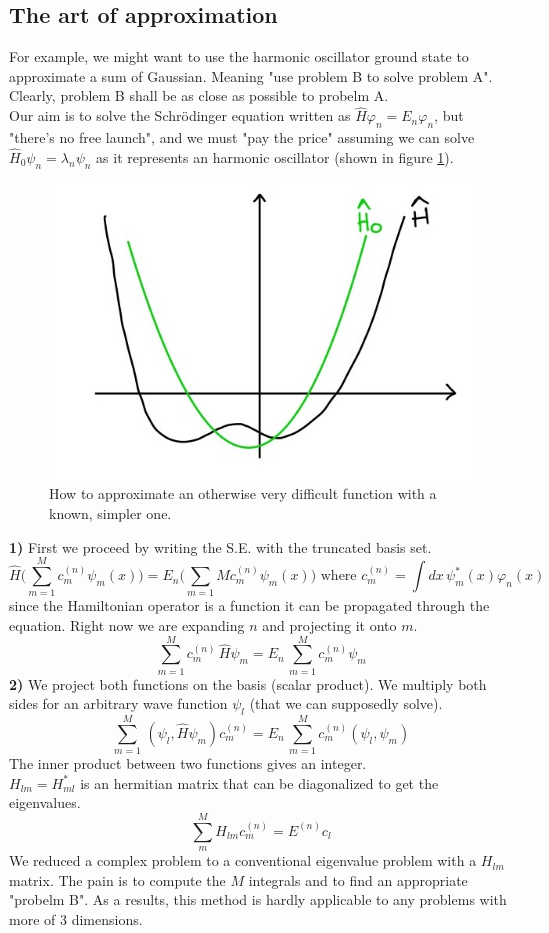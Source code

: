 \noindent
\subsection{The art of approximation}
For example, we might want to use the harmonic oscillator ground state to approximate a sum of Gaussian. Meaning "use problem B to solve problem A". Clearly, problem B shall be as close as possible to probelm A.\\
Our aim is to solve the Schr{\"o}dinger equation written as $\hat{H}\varphi_n=E_n\varphi_n$, but "there's no free launch", and we must "pay the price" assuming we can solve $\hat{H}_0\psi_n=\lambda_n\psi_n$ as it represents an harmonic oscillator (shown in figure \ref{fig:approximation}).\\
\begin{figure}[htbp!]
\includegraphics[scale=0.20]{img_1.jpg}
\caption{How to approximate an otherwise very difficult function with a known, simpler one.}
\label{fig:approximation}
\end{figure}
\textbf{1)} First we proceed by writing the S.E. with the truncated basis set.
\[
\hat{H}\bigg(\sum_{m=1}^{M}c_m^{(n)}\psi_m(x)\bigg)=E_n\bigg(\sum_{m=1}{M}c_m^{(n)}\psi_m(x)\bigg)
\text{ where $c_m^{(n)}=\int dx\,\psi_m^*(x)\varphi_n(x)$}
\]
since the Hamiltonian operator is a function it can be propagated through the equation. Right now we are expanding $n$ and projecting it onto $m$.\\
\[
\sum_{m=1}^{M}c_m^{(n)}\,\hat{H}\psi_m=E_n\,\sum_{m=1}^{M}c_m^{(n)}\psi_m\]
\textbf{2)} We project both functions on the basis (scalar product). We multiply both sides for an arbitrary wave function $\psi_l$ (that we can supposedly solve).
\[\sum_{m=1}^{M}\,(\psi_l,\hat{H}\psi_m)c_m^{(n)}=E_n\,\sum_{m=1}^{M}c_m^{(n)}(\psi_l,\psi_m)
\]
The inner product between two functions gives an integer. \\
$H_{lm}=H_{ml}^*$ is an hermitian matrix that can be diagonalized to get the eigenvalues.\\
\[
\sum_{m}^{M}H_{lm}c_m^{(n)}=E^{(n)}c_l
\]
We reduced a complex problem to a conventional eigenvalue problem with a $H_{lm}$ matrix. The pain is to compute the $M$ integrals and to find an appropriate "probelm B". As a results, this method is hardly applicable to any problems with more of 3 dimensions. \\

